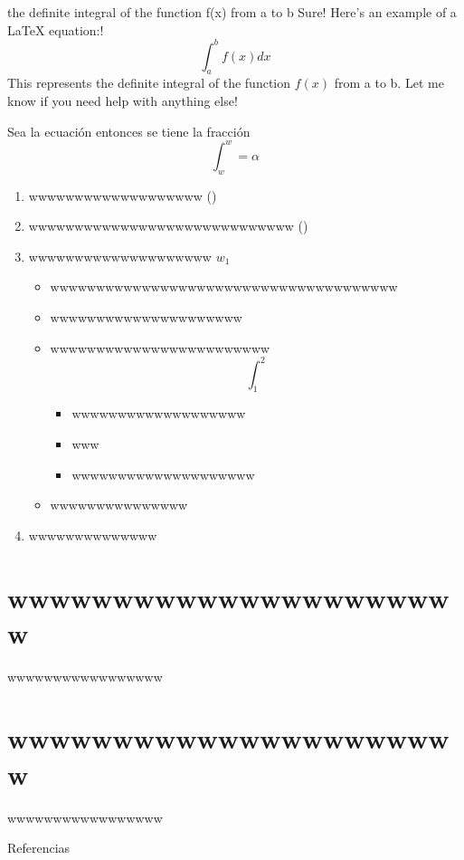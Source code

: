\documentclass[11pt,aspectratio=1610,spanish]{beamer}
\begin{document}
\begin{frame}
	the definite integral of the function f(x) from a to b
	Sure! Here's an example of a LaTeX equation:!
	\[ \int_{a}^{b} f(x)dx \]
	This represents the definite integral of the function $ f(x) $ from a to b. Let me know if you need help with anything else!

	Sea la ecuación entonces se tiene la fracción
	\begin{equation}\label{key}
		\int_{w}^{w}=\alpha
	\end{equation}
	\begin{enumerate}
		\item wwwwwwwwwwwwwwwwwww (\cite{Hatcher:478079})
		      \cite{einstein}
		\item wwwwwwwwwwwwwwwwwwwwwwwwwwwww (\cite{dirac})
		\item wwwwwwwwwwwwwwwwwwww $ w_1 $
		      \begin{itemize}
			      \item wwwwwwwwwwwwwwwwwwwwwwwwwwwwwwwwwwwwww
			      \item wwwwwwwwwwwwwwwwwwwww
			      \item wwwwwwwwwwwwwwwwwwwwwwww
			            \[ \int_{1}^{2} \]
			            \begin{itemize}
				            \item wwwwwwwwwwwwwwwwwww
				            \item www
				            \item wwwwwwwwwwwwwwwwwwww
			            \end{itemize}
			      \item wwwwwwwwwwwwwww
		      \end{itemize}
		\item wwwwwwwwwwwwww
	\end{enumerate}
\end{frame}



\section{wwwwwwwwwwwwwwwwwwwwww}
\begin{frame}
	wwwwwwwwwwwwwwwww
\end{frame}

\section{wwwwwwwwwwwwwwwwwwwwww}
\begin{frame}
	wwwwwwwwwwwwwwwww
\end{frame}

\begin{frame}{Referencias}
	\printbibliography
\end{frame}
\end{document}
